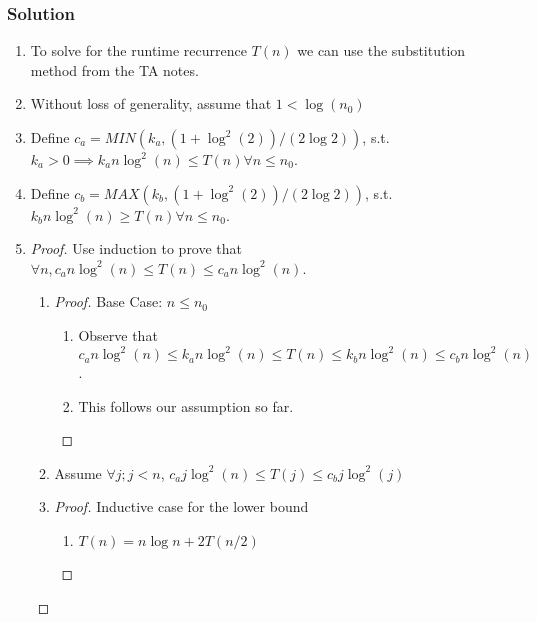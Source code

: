 \documentclass{article}
\begin{document}
\subsubsection{Solution}
\begin{enumerate}
      \item To solve for the runtime recurrence \(T(n)\) we can use the substitution
            method from the TA notes.
      \item Without loss of generality, assume that \(1 < \log (n_0)\)
      \item Define \( c_a = MIN(k_a, (1+\log ^2(2)) /( 2 \log 2))\), s.t. \(k_a > 0 \implies k_a n
            \log^2(n) \leq T(n) \forall n \leq n_0 \).
      \item Define \( c_b = MAX(k_b, (1 + \log^2 (2)) / (2 \log 2))\), s.t. \(k_b n \log^2
            (n) \geq T(n) \forall n \leq n_0\).
      \item \begin{proof} Use induction to prove that \(\forall n, c_a n \log^2 (n) \leq T(n) \leq c_a n
                  \log^2(n)\).
                  \begin{enumerate}
                        \item \begin{proof}
                                    Base Case: \(n \leq n_0\)
                                    \begin{enumerate}
                                          \item Observe that \(c_a n \log^2 (n) \leq k_a n
                                                \log^2 (n) \leq T(n) \leq k_b n \log^2(n)
                                                \leq c_b n \log^2 (n)\).
                                          \item This follows our assumption so far.
                                    \end{enumerate}
                              \end{proof}
                        \item Assume \(\forall j; j < n\), \(c_a j \log^2(n) \leq
                              T(j) \leq c_b j \log^2 (j) \)
                        \item \begin{proof}
                                    Inductive case for the lower bound
                                    \begin{enumerate}
                                          \item \(T(n) = n \log n + 2 T(n/2)\)

\end{enumerate}
\end{proof}
\end{enumerate}
\end{proof}
\end{enumerate}
\end{document}
